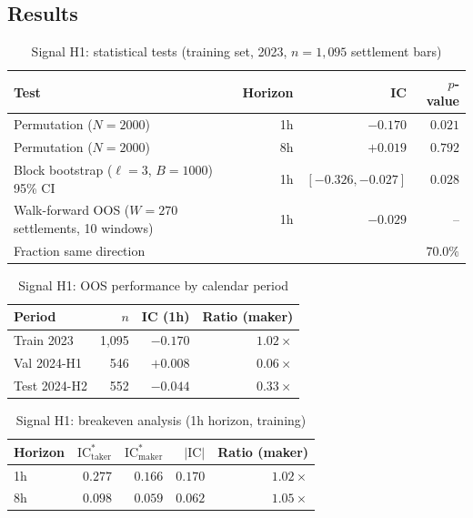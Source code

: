 \documentclass[12pt, a4paper]{article}
\theoremstyle{definition}
\newcommand{\IC}{\mathrm{IC}}
\begin{document}
\subsection{Results}

\begin{table}[H]
\centering
\caption{Signal H1: statistical tests (training set, 2023, $n=1{,}095$ settlement bars)}
\begin{tabular}{lrrr}
\toprule
Test & Horizon & IC & $p$-value \\
\midrule
Permutation ($N=2000$) & 1h & $-0.170$ & $0.021$ \\
Permutation ($N=2000$) & 8h & $+0.019$ & $0.792$ \\
Block bootstrap ($\ell=3$, $B=1000$) 95\% CI & 1h & $[-0.326, -0.027]$ & $0.028$ \\
\midrule
Walk-forward OOS ($W=270$ settlements, 10 windows) & 1h & $-0.029$ & -- \\
\quad Fraction same direction & & & $70.0\%$ \\
\bottomrule
\end{tabular}
\end{table}

\begin{table}[H]
\centering
\caption{Signal H1: OOS performance by calendar period}
\label{tab:h1_oos}
\begin{tabular}{lrrr}
\toprule
Period & $n$ & IC (1h) & Ratio (maker) \\
\midrule
Train 2023         & 1,095 & $-0.170$ & $1.02\times$ \\
Val   2024-H1      & 546   & $+0.008$ & $0.06\times$ \\
Test  2024-H2      & 552   & $-0.044$ & $0.33\times$ \\
\bottomrule
\end{tabular}
\end{table}

\begin{table}[H]
\centering
\caption{Signal H1: breakeven analysis (1h horizon, training)}
\begin{tabular}{lrrrr}
\toprule
Horizon & $\IC^*_{\text{taker}}$ & $\IC^*_{\text{maker}}$ & $|\IC|$ & Ratio (maker) \\
\midrule
1h & $0.277$ & $0.166$ & $0.170$ & $\mathbf{1.02\times}$ \\
8h & $0.098$ & $0.059$ & $0.062$ & $1.05\times$ \\
\bottomrule
\end{tabular}
\end{table}
\end{document}
